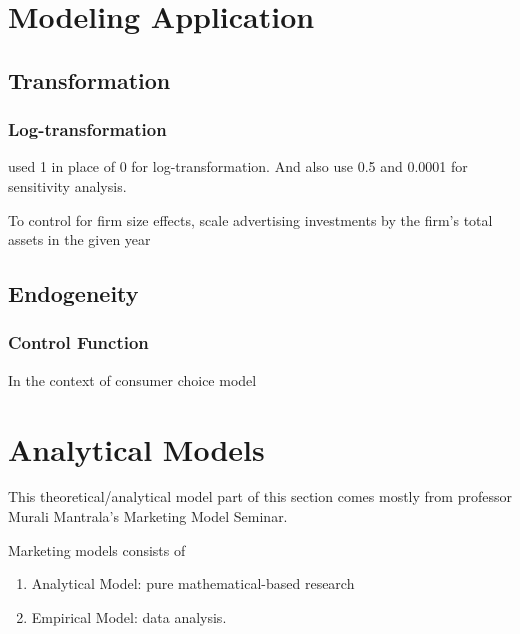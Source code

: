 \documentclass[
]{book}
\providecommand{\tightlist}{%
  \setlength{\itemsep}{0pt}\setlength{\parskip}{0pt}}
\begin{document}
\hypertarget{modeling-application}{%
\chapter{Modeling Application}\label{modeling-application}}

\hypertarget{transformation}{%
\section{Transformation}\label{transformation}}

\hypertarget{log-transformation}{%
\subsection{Log-transformation}\label{log-transformation}}

\citep{Manchanda_2004, Wies_2019} used 1 in place of 0 for log-transformation. And also use 0.5 and 0.0001 for sensitivity analysis.

To control for firm size effects, \citep{Wies_2019} scale advertising investments by the firm's total assets in the given year

\hypertarget{endogeneity}{%
\section{Endogeneity}\label{endogeneity}}

\hypertarget{control-function}{%
\subsection{Control Function}\label{control-function}}

In the context of consumer choice model \citep{Petrin_2010}

\hypertarget{analytical-models}{%
\chapter{Analytical Models}\label{analytical-models}}

This theoretical/analytical model part of this section comes mostly from professor Murali Mantrala's Marketing Model Seminar.

Marketing models consists of

\begin{enumerate}
\def\labelenumi{\arabic{enumi}.}
\tightlist
\item
  Analytical Model: pure mathematical-based research
\item
  Empirical Model: data analysis.
\end{enumerate}
\end{document}
